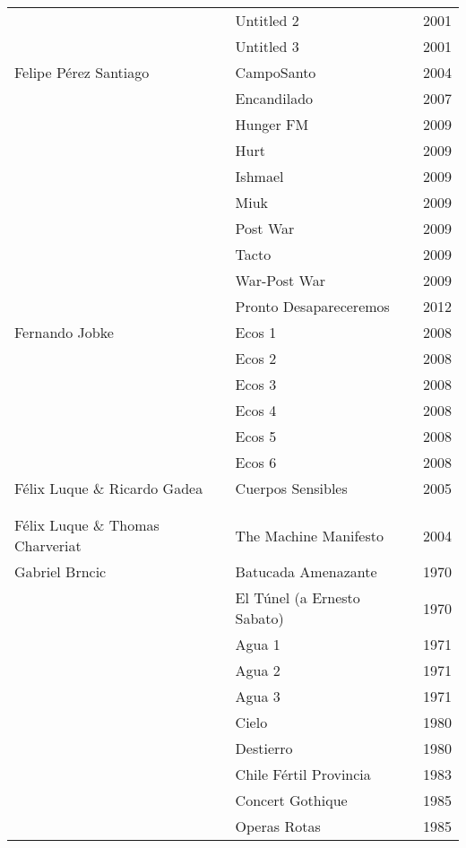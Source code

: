 \begin{center}
\begin{longtable}{ p{}  p{}  p{} }
& Untitled 2 & 2001 \\ \cmidrule (r){2-3} 
& Untitled 3 & 2001 \\ \midrule 
Felipe Pérez Santiago & CampoSanto & 2004 \\ \cmidrule (r){2-3} 
& Encandilado & 2007 \\ \cmidrule (r){2-3} 
& Hunger FM & 2009 \\ \cmidrule (r){2-3} 
& Hurt & 2009 \\ \cmidrule (r){2-3} 
& Ishmael & 2009 \\ \cmidrule (r){2-3} 
& Miuk & 2009 \\ \cmidrule (r){2-3} 
& Post War & 2009 \\ \cmidrule (r){2-3} 
& Tacto & 2009 \\ \cmidrule (r){2-3} 
& War-Post War & 2009 \\ \cmidrule (r){2-3} 
& Pronto Desapareceremos & 2012 \\ \midrule 
Fernando Jobke & Ecos 1 & 2008 \\ \cmidrule (r){2-3} 
& Ecos 2 & 2008 \\ \cmidrule (r){2-3} 
& Ecos 3 & 2008 \\ \cmidrule (r){2-3} 
& Ecos 4 & 2008 \\ \cmidrule (r){2-3} 
& Ecos 5 & 2008 \\ \cmidrule (r){2-3} 
& Ecos 6 & 2008 \\ \midrule 
Félix Luque \& Ricardo Gadea & Cuerpos Sensibles & 2005 \\ \midrule \\ \\ \midrule  
Félix Luque \& Thomas Charveriat & The Machine Manifesto & 2004 \\ \midrule 
Gabriel Brncic & Batucada Amenazante & 1970 \\ \cmidrule (r){2-3} 
& El Túnel (a Ernesto Sabato) & 1970 \\ \cmidrule (r){2-3} 
& Agua 1 & 1971 \\ \cmidrule (r){2-3} 
& Agua 2 & 1971 \\ \cmidrule (r){2-3} 
& Agua 3 & 1971 \\ \cmidrule (r){2-3} 
& Cielo & 1980 \\ \cmidrule (r){2-3} 
& Destierro & 1980 \\ \cmidrule (r){2-3} 
& Chile Fértil Provincia & 1983 \\ \cmidrule (r){2-3} 
& Concert Gothique & 1985 \\ \cmidrule (r){2-3} 
& Operas Rotas & 1985 \\ \cmidrule (r){2-3} 

\end{longtable}
\end{center}
